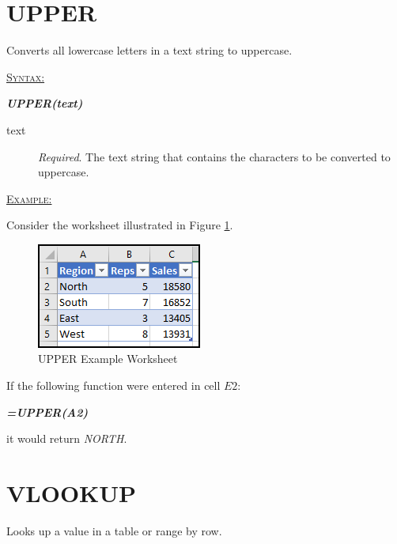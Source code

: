 \section{UPPER}

Converts all lowercase letters in a text string to uppercase.

\begin{addmargin}[1cm]{0cm}
	
	\medskip
	\underline{\textsc{Syntax:}}
	\medskip
	
	{\color{Syntax}
		\noindent\textbf{\textit{UPPER(text)}}
	}
	
	\begin{description}
		\item[text] \textit{Required}. The text string that contains the characters to be converted to uppercase.
	\end{description}

	\medskip
	\noindent\underline{\textsc{Example:}}
	\medskip
	
	\noindent Consider the worksheet illustrated in Figure \ref{apa:up}.
	
	\begin{figure}[H]
		\centering
		\includegraphics[width=\maxwidth{.45\linewidth}]{gfx/apa_fig01}
		\caption{UPPER Example Worksheet}
		\label{apa:up}
	\end{figure}
	
	\noindent If the following function were entered in cell $ E2 $:
	
	{\color{Syntax}
		\textit{\textbf{=UPPER(A2)}}
	}
	
	\noindent it would return \textit{NORTH}.

\end{addmargin}

\section{VLOOKUP}

Looks up a value in a table or range by row. 

